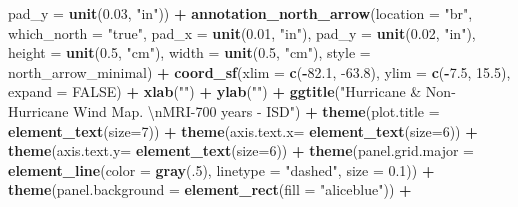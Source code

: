 \documentclass[12pt,twoside]{reedthesis}
\newenvironment{Shaded}{\begin{snugshade}}{\end{snugshade}}
\newcommand{\CharTok}[1]{\textcolor[rgb]{0.31,0.60,0.02}{#1}}
\newcommand{\DataTypeTok}[1]{\textcolor[rgb]{0.13,0.29,0.53}{#1}}
\newcommand{\DecValTok}[1]{\textcolor[rgb]{0.00,0.00,0.81}{#1}}
\newcommand{\FloatTok}[1]{\textcolor[rgb]{0.00,0.00,0.81}{#1}}
\newcommand{\KeywordTok}[1]{\textcolor[rgb]{0.13,0.29,0.53}{\textbf{#1}}}
\newcommand{\NormalTok}[1]{#1}
\newcommand{\OperatorTok}[1]{\textcolor[rgb]{0.81,0.36,0.00}{\textbf{#1}}}
\newcommand{\OtherTok}[1]{\textcolor[rgb]{0.56,0.35,0.01}{#1}}
\newcommand{\StringTok}[1]{\textcolor[rgb]{0.31,0.60,0.02}{#1}}
\begin{document}
\begin{Shaded}
\begin{Highlighting}[]
   \DataTypeTok{pad_y =} \KeywordTok{unit}\NormalTok{(}\FloatTok{0.03}\NormalTok{, }\StringTok{"in"}\NormalTok{)) }\OperatorTok{+}\StringTok{ }
\StringTok{  }\KeywordTok{annotation_north_arrow}\NormalTok{(}\DataTypeTok{location =} \StringTok{"br"}\NormalTok{, }\DataTypeTok{which_north =} \StringTok{"true"}\NormalTok{, }\DataTypeTok{pad_x =} \KeywordTok{unit}\NormalTok{(}\FloatTok{0.01}\NormalTok{, }\StringTok{"in"}\NormalTok{), }\DataTypeTok{pad_y =} \KeywordTok{unit}\NormalTok{(}\FloatTok{0.02}\NormalTok{, }\StringTok{"in"}\NormalTok{), }\DataTypeTok{height =} \KeywordTok{unit}\NormalTok{(}\FloatTok{0.5}\NormalTok{, }\StringTok{"cm"}\NormalTok{), }
   \DataTypeTok{width =} \KeywordTok{unit}\NormalTok{(}\FloatTok{0.5}\NormalTok{, }\StringTok{"cm"}\NormalTok{), }\DataTypeTok{style =}\NormalTok{ north_arrow_minimal) }\OperatorTok{+}
\StringTok{  }\KeywordTok{coord_sf}\NormalTok{(}\DataTypeTok{xlim =} \KeywordTok{c}\NormalTok{(}\OperatorTok{-}\FloatTok{82.1}\NormalTok{, }\FloatTok{-63.8}\NormalTok{), }\DataTypeTok{ylim =} \KeywordTok{c}\NormalTok{(}\OperatorTok{-}\FloatTok{7.5}\NormalTok{, }\FloatTok{15.5}\NormalTok{), }\DataTypeTok{expand =} \OtherTok{FALSE}\NormalTok{) }\OperatorTok{+}
\StringTok{  }\KeywordTok{xlab}\NormalTok{(}\StringTok{""}\NormalTok{) }\OperatorTok{+}\StringTok{ }
\StringTok{  }\KeywordTok{ylab}\NormalTok{(}\StringTok{""}\NormalTok{) }\OperatorTok{+}\StringTok{ }
\StringTok{  }\KeywordTok{ggtitle}\NormalTok{(}\StringTok{"Hurricane & Non-Hurricane Wind Map. }\CharTok{\textbackslash{}n}\StringTok{MRI-700 years - ISD"}\NormalTok{) }\OperatorTok{+}\StringTok{ }
\StringTok{  }\KeywordTok{theme}\NormalTok{(}\DataTypeTok{plot.title =} \KeywordTok{element_text}\NormalTok{(}\DataTypeTok{size=}\DecValTok{7}\NormalTok{)) }\OperatorTok{+}
\StringTok{  }\KeywordTok{theme}\NormalTok{(}\DataTypeTok{axis.text.x=} \KeywordTok{element_text}\NormalTok{(}\DataTypeTok{size=}\DecValTok{6}\NormalTok{)) }\OperatorTok{+}\StringTok{ }
\StringTok{  }\KeywordTok{theme}\NormalTok{(}\DataTypeTok{axis.text.y=} \KeywordTok{element_text}\NormalTok{(}\DataTypeTok{size=}\DecValTok{6}\NormalTok{)) }\OperatorTok{+}
\StringTok{  }\KeywordTok{theme}\NormalTok{(}\DataTypeTok{panel.grid.major =} \KeywordTok{element_line}\NormalTok{(}\DataTypeTok{color =} \KeywordTok{gray}\NormalTok{(.}\DecValTok{5}\NormalTok{), }\DataTypeTok{linetype =} \StringTok{"dashed"}\NormalTok{, }\DataTypeTok{size =} \FloatTok{0.1}\NormalTok{)) }\OperatorTok{+}
\StringTok{  }\KeywordTok{theme}\NormalTok{(}\DataTypeTok{panel.background =} \KeywordTok{element_rect}\NormalTok{(}\DataTypeTok{fill =} \StringTok{"aliceblue"}\NormalTok{)) }\OperatorTok{+}

\end{Highlighting}
\end{Shaded}
\end{document}

